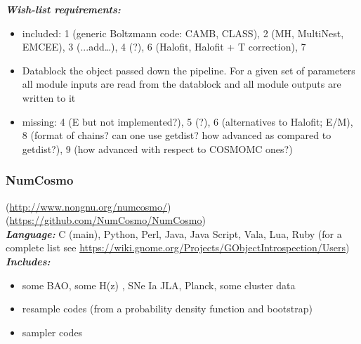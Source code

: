 {\it \bf Wish-list requirements: }
\begin{itemize}
 \item included: 1 (generic Boltzmann code: CAMB, CLASS), 2 (MH, MultiNest, EMCEE), 3 (...add…), 4 (?), 6 (Halofit, Halofit + T correction), 7
 \item Datablock the object passed down the pipeline. For a given set of parameters all module inputs are read from the datablock and all module outputs are written to it 
 \item missing: 4 (E but not implemented?), 5 (?), 6 (alternatives to Halofit; E/M), 8 (format of chains? can one use getdist? how advanced as compared to getdist?), 9 
 (how advanced with respect to COSMOMC ones?) 
\end{itemize}

\newpage
\subsubsection{NumCosmo}

(\url{http://www.nongnu.org/numcosmo/})\\
(\url{https://github.com/NumCosmo/NumCosmo}) \\

{\it \bf Language:} C (main), Python, Perl, Java, Java Script, Vala, Lua, Ruby (for a complete list see \url{https://wiki.gnome.org/Projects/GObjectIntrospection/Users})
\\

{\it \bf Includes:}
\begin{itemize}
 \item some BAO, some H(z) , SNe Ia JLA,  Planck, some cluster data
\item resample codes (from a probability density function and  bootstrap)
\item sampler codes
\end{itemize}

